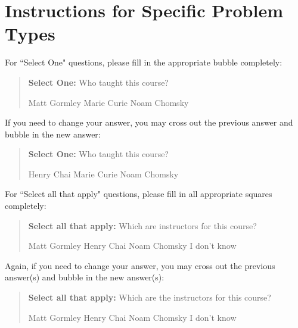 \documentclass[11pt,addpoints,answers]{exam}
\newcommand{\blackcircle}{\tikz\draw[black,fill=black] (0,0) circle (1ex);}
\begin{document}
\section*{Instructions for Specific Problem Types}

For ``Select One" questions, please fill in the appropriate bubble completely:

\begin{quote}
\textbf{Select One:} Who taught this course?
    \begin{checkboxes}
     \CorrectChoice Matt Gormley
     \choice Marie Curie
     \choice Noam Chomsky
    \end{checkboxes}
\end{quote}

If you need to change your answer, you may cross out the previous answer and bubble in the new answer:

\begin{quote}
\textbf{Select One:} Who taught this course?
    {
    \begin{checkboxes}
     \CorrectChoice Henry Chai
     \choice Marie Curie \checkboxchar{\xcancel{\blackcircle}{}}
     \choice Noam Chomsky
    \end{checkboxes}
    }
\end{quote}

For ``Select all that apply" questions, please fill in all appropriate squares completely:

\begin{quote}
\textbf{Select all that apply:} Which are instructors for this course?
    {%
    \checkboxchar{$\Box$} \checkedchar{$\blacksquare$} %
    \begin{checkboxes}
    \CorrectChoice Matt Gormley  
    \CorrectChoice Henry Chai
    \choice Noam Chomsky
    \choice I don't know
    \end{checkboxes}
    }
\end{quote}

Again, if you need to change your answer, you may cross out the previous answer(s) and bubble in the new answer(s):

\begin{quote}
\textbf{Select all that apply:} Which are the instructors for this course?
    {%
    \checkboxchar{\xcancel{$\blacksquare$}} \checkedchar{$\blacksquare$} %
    \begin{checkboxes}
    \CorrectChoice Matt Gormley 
    \CorrectChoice Henry Chai
    \choice Noam Chomsky
    \choice I don't know
    \end{checkboxes}
    }
\end{quote}
\end{document}
